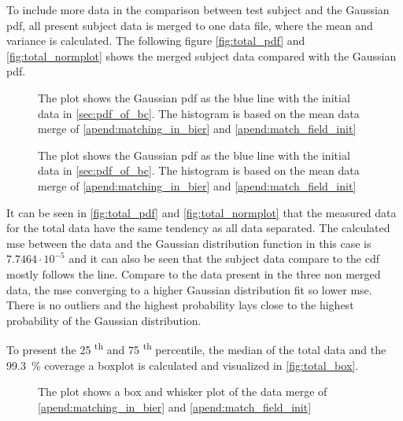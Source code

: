 To include more data in the comparison between test subject and the Gaussian \gls{pdf}, all present subject data is merged to one data file, where the mean and variance is calculated. The following figure \autoref{fig:total_pdf} and \autoref{fig:total_normplot} shows the merged subject data compared with the Gaussian \gls{pdf}.


 \begin{figure}[H]
	\centering
	
		\caption{The plot shows the Gaussian  \gls{pdf} as the blue line with the initial data in \autoref{sec:pdf_of_bc}. The histogram is based on the mean data merge of \autoref{apend:matching_in_bier} and \autoref{apend:match_field_init}}
		\label{fig:total_pdf}
\end{figure}

 \begin{figure}[H]
	\centering
	
		\caption{The plot shows the Gaussian  \gls{pdf} as the blue line with the initial data in \autoref{sec:pdf_of_bc}. The histogram is based on the mean data merge of \autoref{apend:matching_in_bier} and \autoref{apend:match_field_init}}
		\label{fig:total_normplot}
\end{figure}

It can be seen in \autoref{fig:total_pdf} and \autoref{fig:total_normplot} that the measured data for the total data have the same tendency as all data separated. The calculated \gls{mse} between the data and the Gaussian distribution function in this case is $7.7464 \cdot 10^{-5}$ and it can also be seen that the subject data compare to the \gls{cdf} mostly follows the line. Compare to the data present in the three non merged data, the \gls{mse} converging to a higher Gaussian distribution fit so lower \gls{mse}. There is no outliers and the highest probability lays close to the highest probability of the Gaussian distribution. 

To present the 25 \textsuperscript{th} and 75 \textsuperscript{th} percentile, the median of the total data and the \SI{99.3}{\percent} coverage a boxplot is calculated and visualized in \autoref{fig:total_box}.

 \begin{figure}[H]
	\centering
	
		\caption{The plot shows a box and whisker plot of the data merge of \autoref{apend:matching_in_bier} and \autoref{apend:match_field_init}}
		\label{fig:total_box}
\end{figure}


